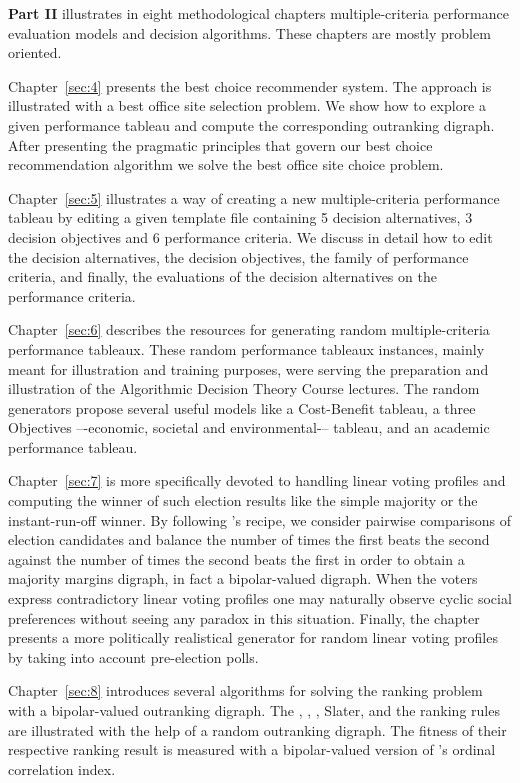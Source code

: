 \textbf{Part II} illustrates in eight methodological chapters multiple-criteria performance evaluation models and decision algorithms. These chapters are mostly problem oriented.

Chapter~\ref{sec:4} presents the \Rubis best choice recommender system. The approach is illustrated with a best office site selection problem. We show how to explore a given performance tableau and compute the corresponding outranking digraph. After presenting the pragmatic principles that govern our best choice recommendation algorithm we solve the best office site choice problem.

Chapter~\ref{sec:5} illustrates a way of creating a new multiple-criteria performance tableau by editing a given template file containing 5 decision alternatives, 3 decision objectives and 6 performance criteria. We discuss in detail how to edit the decision alternatives, the decision objectives, the family of performance criteria, and finally, the evaluations of the decision alternatives on the performance criteria.

Chapter~\ref{sec:6} describes the \Digraph resources for generating random multiple-criteria performance tableaux. These random performance tableaux instances, mainly meant for illustration and training purposes, were serving the preparation and illustration of the Algorithmic Decision Theory Course lectures. The random generators propose several useful models like a Cost-Benefit tableau, a three Objectives –-economic, societal and environmental-– tableau, and an academic performance tableau.

Chapter~\ref{sec:7} is more specifically devoted to handling linear voting profiles and computing the winner of such election results like the simple majority or the instant-run-off winner. By following \Condorcet 's recipe, we consider pairwise comparisons of election candidates and balance the number of times the first beats the second against the number of times the second beats the first in order to obtain a majority margins digraph, in fact a bipolar-valued digraph. When the voters express contradictory linear voting profiles one may naturally observe cyclic social preferences without seeing any paradox in this situation. Finally, the chapter presents a more politically realistical generator for random linear voting profiles by taking into account pre-election polls.

Chapter~\ref{sec:8} introduces several algorithms for solving the ranking problem with a bipolar-valued outranking digraph. The \Copeland, \NetFlows, \Kemeny, {\sc Sla\-ter}, \Kohler and the \RankedPairs ranking rules are illustrated with the help of a random outranking digraph. The fitness of their respective ranking result is measured with a bipolar-valued version of \Kendall 's ordinal correlation index.

